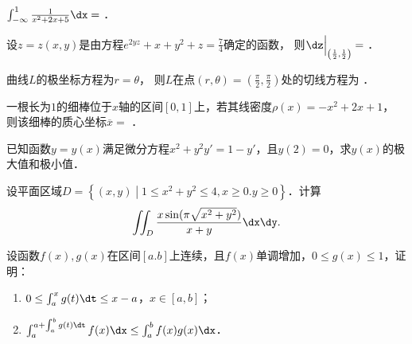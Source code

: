 \documentclass[plain,noanswer,medmath]{../../template/jnuexam}
\begin{document}






\begin{problem}
$\int_{-\infty}^{1} \frac{1}{x^2 + 2x + 5}\dx =$ \fillin{}．
\end{problem}




\begin{problem}
设$z = z(x,y)$是由方程$e^{2yz} + x + y^2 + z = \frac{7}{4}$确定的函数，
则$\dz\Big|_{\left(\frac{1}{2},\frac{1}{2}\right)} =$ \fillin{}．
\end{problem}


\begin{problem}
曲线$L$的极坐标方程为$r = \theta$，
则$L$在点$(r,\theta) = \left(\frac{\pi}{2},\frac{\pi}{2}\right)$处的切线方程为 \fillin{}．
\end{problem}


\begin{problem}
一根长为$1$的细棒位于$x$轴的区间$[0,1]$上，若其线密度$\rho (x) = - x^2 + 2x + 1$，
则该细棒的质心坐标$\overline{x} =$ \fillin{}．
\end{problem}








\begin{problem}[points=10]
已知函数$y = y(x)$满足微分方程$x^2 + y^2 y' = 1 - y'$，且$y(2) = 0$，求$y(x)$的极大值和极小值．
\end{problem}


\begin{problem}[points=10]
设平面区域$D = \left\{(x,y)\middle|1 \le x^2 + y^2 \le 4,x \ge 0.y \ge 0 \right\}$．计算
$$\iint_D \frac{x\sin(\pi \sqrt{x^2 + y^2})}{x + y}\dx\dy.$$
\end{problem}




\begin{problem}[points=10]
设函数$f(x),g(x)$在区间$[a.b]$上连续，且$f(x)$单调增加，$0 \le g(x) \le 1$，证明：
\begin{enumerate}
\item $0 \le \int_a^x g(t)\dt \le x - a$，$x \in [a,b]$；
\item $\int_a^{a + \int_a^b g(t)\dt} f(x)\dx \le \int_a^b f(x)g(x)\dx$．
\end{enumerate}
\end{problem}
\end{document}
